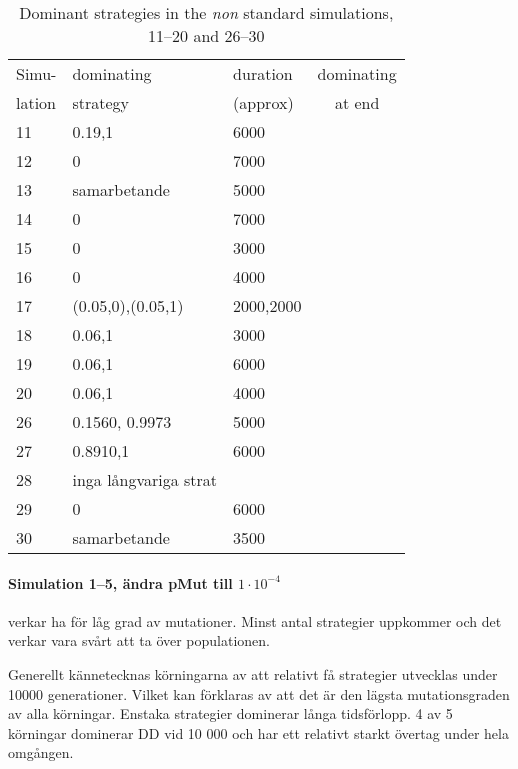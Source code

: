 \begin{table}[!hbtp]
  \footnotesize
  \centering
  \label{tab:results:dominant:11}
  \caption{Dominant strategies in the \textit{non} standard simulations, 11--20 and
    26--30}
  \begin{tabular}{lllc}
    Simu-  & dominating & duration  & dominating \\
    lation & strategy   & (approx)  & at end \\
    \hline
11  &  0.19,1              & 6000      \\          
12  &  0                   & 7000               \\ 
13  &  samarbetande        & 5000               \\ 
14  &  0                   & 7000               \\ 
15  &  0                   & 3000               \\ 
16  &  0                   & 4000      \\          
17  &  (0.05,0),(0.05,1)   & 2000,2000 \\          
18  &  0.06,1              & 3000               \\ 
19  &  0.06,1              & 6000      \\          
20  &  0.06,1              & 4000      \\          
26  & 0.1560, 0.9973       & 5000\\          
27  & 0.8910,1             & 6000\\          
28  & inga långvariga strat&              \\ 
29  & 0                    & 6000\\          
30  & samarbetande         & 3500\\          
    \hline
  \end{tabular}
\end{table}

\paragraph{Simulation 1--5, ändra pMut till $1\cdot 10^{-4}$}
verkar ha för låg grad av mutationer. Minst antal strategier uppkommer och det verkar vara svårt att ta över populationen.\mypar

Generellt kännetecknas körningarna av att relativt få strategier utvecklas under 10000 generationer.
Vilket kan förklaras av att det är den lägsta mutationsgraden av alla körningar. Enstaka strategier
dominerar långa tidsförlopp. 4 av 5 körningar dominerar DD vid 10 000 och har ett relativt starkt
övertag under hela omgången.\mypar

